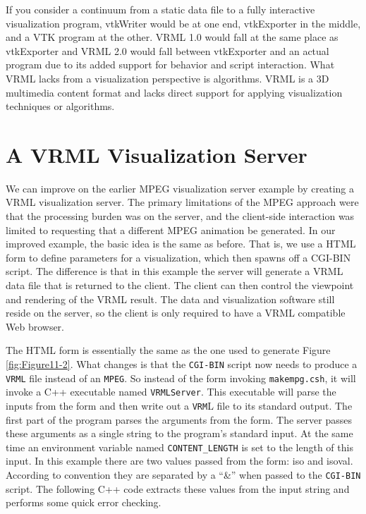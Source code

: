 If you consider a continuum from a static data file to a fully interactive visualization program, vtkWriter would be at one end, vtkExporter in the middle, and a VTK program at the other. VRML 1.0 would fall at the same place as vtkExporter and VRML 2.0 would fall between vtkExporter and an actual program due to its added support for behavior and script interaction. What VRML lacks from a visualization perspective is algorithms. VRML is a 3D multimedia content format and lacks direct support for applying visualization techniques or algorithms.

\section{A VRML Visualization Server}

We can improve on the earlier MPEG visualization server example by creating a VRML visualization server. The primary limitations of the MPEG approach were that the processing burden was on the server, and the client-side interaction was limited to requesting that a different MPEG animation be generated. In our improved example, the basic idea is the same as before. That is, we use a HTML form to define parameters for a visualization, which then spawns off a CGI-BIN script. The difference is that in this example the server will generate a VRML data file that is returned to the client. The client can then control the viewpoint and rendering of the VRML result. The data and visualization software still reside on the server, so the client is only required to have a VRML compatible Web browser.

The HTML form is essentially the same as the one used to generate Figure \ref{fig:Figure11-2}. What changes is that the \texttt{CGI-BIN} script now needs to produce a \texttt{VRML} file instead of an \texttt{MPEG}. So instead of the form invoking \texttt{makempg.csh}, it will invoke a C++ executable named \texttt{VRMLServer}. This executable will parse the inputs from the form and then write out a \texttt{VRM}L file to its standard output. The first part of the program parses the arguments from the form. The server passes these arguments as a single string to the program’s standard input. At the same time an environment variable named \texttt{CONTENT\_LENGTH} is set to the length of this input. In this example there are two values passed from the form: iso and isoval. According to convention they are separated by a ``\&'' when passed to the \texttt{CGI-BIN} script. The following C++ code extracts these values from the input string and performs some quick error checking.

